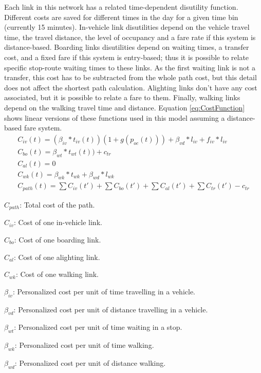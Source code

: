 Each link in this network has a related time-dependent disutility function. Different costs are saved for different times in the day for a given time bin (currently 15 minutes). In-vehicle link disutilities depend on the vehicle travel time, the travel distance, the level of occupancy and a fare rate if this system is distance-based. Boarding links disutilities depend on waiting times, a transfer cost, and a fixed fare if this system is entry-based; thus it is possible to relate specific stop-route waiting times to these links. As the first waiting link is not a transfer, this cost has to be subtracted from the whole path cost, but this detail does not affect the shortest path calculation. Alighting links don't have any cost associated, but it is possible to relate a fare to them. Finally, walking links depend on the walking travel time and distance. Equation \ref{eq:CostFunction} shows linear versions of these functions used in this model assuming a distance-based fare system.
\begin{equation}\label{eq:CostFunction}
	\begin{array}{l}
		C_{iv}(t) = (\beta_{iv}*t_{iv}(t))(1+g(p_{oc}(t))) + \beta_{vd}*l_{iv} + f_{iv}*l_{iv}\\
		C_{bo}(t) = \beta_{wt}*t_{wt}(t)) + c_{tr}\\
		C_{al}(t) = 0\\
		C_{wk}(t) = \beta_{wk}*t_{wk} + \beta_{wd}*l_{wk}\\
		C_{path}(t) = \sum{C_{iv}(t')} + \sum{C_{bo}(t')} + \sum{C_{al}(t')} + \sum{C_{tr}(t')} - c_{tr}
	\end{array}
\end{equation}

$C_{path}$: Total cost of the path.

$C_{iv}$: Cost of one in-vehicle link.

$C_{bo}$: Cost of one boarding link.

$C_{al}$: Cost of one alighting link.

$C_{wk}$: Cost of one walking link.

$\beta_{iv}$: Personalized cost per unit of time travelling in a vehicle.

$\beta_{vd}$: Personalized cost per unit of distance travelling in a vehicle.

$\beta_{wt}$: Personalized cost per unit of time waiting in a stop.

$\beta_{wk}$: Personalized cost per unit of time walking.

$\beta_{wd}$: Personalized cost per unit of distance walking.

